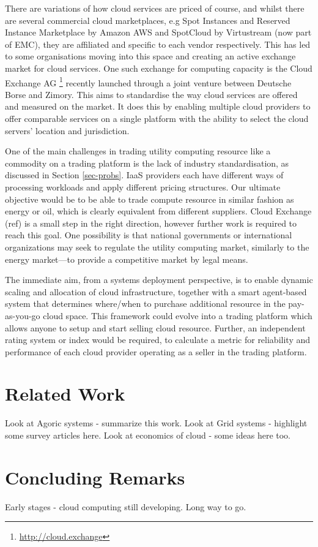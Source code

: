 \documentclass[conference,10pt]{IEEEtran}
\begin{document}
There are variations of how cloud services are priced of course, and whilst there are several commercial cloud marketplaces, e.g Spot Instances and Reserved Instance Marketplace by Amazon AWS and SpotCloud by Virtustream (now part of EMC), they are affiliated and specific to each vendor respectively. 
This has led to some organisations moving into this space and creating an active exchange market for cloud services. One such exchange for computing capacity is the Cloud Exchange AG \footnote{\url{http://cloud.exchange}} recently launched through a joint venture between Deutsche Borse and Zimory.  This aims to standardise the way cloud services are offered and measured on the market. It does this by enabling multiple cloud providers to offer comparable services on a single platform with the ability to select the cloud servers' location and jurisdiction.

One of the main challenges in trading utility computing resource like a commodity on a trading platform is the lack of industry standardisation, as discussed in Section \ref{sec-probs}.
IaaS providers each have different ways of processing workloads and apply different pricing structures. Our ultimate objective would be to be able to trade compute resource in similar fashion as energy or oil, which is clearly equivalent from different suppliers.
Cloud Exchange (ref) is a small step in the right direction, however further work is required to reach this goal. One possibility is that national governments or international organizations may seek to regulate the utility computing market, similarly to the energy market---to provide a competitive market by legal means.


The immediate aim, from a systems deployment perspective, is to enable
dynamic scaling and allocation of cloud infrastructure, together with a smart agent-based system that determines where/when to purchase  additional resource 
in the pay-as-you-go cloud space. 
This framework could evolve into 
a trading platform which allows anyone to setup and start selling cloud resource. Further, an independent rating system or index would be required, to calculate a metric for reliability and performance of each cloud provider operating as a seller in the trading platform.


\section{Related Work}
\label{sec-relw}

Look at Agoric systems - summarize this work.
Look at Grid systems - highlight some survey articles here.
Look at economics of cloud - some ideas here too.

\section{Concluding Remarks}
\label{sec-concl}

Early stages - cloud computing still developing. Long way to go.




\end{document}
